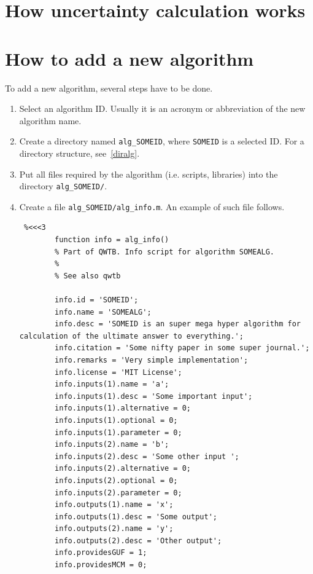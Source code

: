 \documentclass[12pt,a4paper,oneside]{report} %
\begin{document}
\section{How uncertainty calculation works} %

\section{How to add a new algorithm} %
To add a new algorithm, several steps have to be done.

\begin{enumerate}
        \item Select an algorithm ID. Usually it is an acronym or abbreviation of the new algorithm name.

        \item Create a directory named {\tt alg\_SOMEID}, where {\tt SOMEID} is a selected ID. For a
        directory structure, see~\ref{diralg}.

        \item Put all files required by the algorithm (i.e. scripts, libraries) into the directory
        {\tt alg\_SOMEID/}.

        \item Create a file {\tt alg\_SOMEID/alg\_info.m}. An example of such file follows.
        \begin{lstlisting} %<<<3
        function info = alg_info() 
        % Part of QWTB. Info script for algorithm SOMEALG.
        %
        % See also qwtb

        info.id = 'SOMEID';
        info.name = 'SOMEALG';
        info.desc = 'SOMEID is an super mega hyper algorithm for calculation of the ultimate answer to everything.';
        info.citation = 'Some nifty paper in some super journal.';
        info.remarks = 'Very simple implementation';
        info.license = 'MIT License';
        info.inputs(1).name = 'a';
        info.inputs(1).desc = 'Some important input';
        info.inputs(1).alternative = 0;
        info.inputs(1).optional = 0;
        info.inputs(1).parameter = 0;
        info.inputs(2).name = 'b';
        info.inputs(2).desc = 'Some other input ';
        info.inputs(2).alternative = 0;
        info.inputs(2).optional = 0;
        info.inputs(2).parameter = 0;
        info.outputs(1).name = 'x';
        info.outputs(1).desc = 'Some output';
        info.outputs(2).name = 'y';
        info.outputs(2).desc = 'Other output';
        info.providesGUF = 1;
        info.providesMCM = 0;
        \end{lstlisting} %


\end{enumerate}
\end{document}
